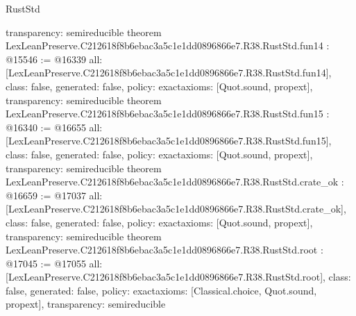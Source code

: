 \begin{lexlean}{RustStd}
\begin{coremodule}
{  transparency: semireducible
}
theorem LexLeanPreserve.C212618f8b6ebac3a5c1e1dd0896866e7.R38.RustStd.fun14 : @15546 := @16339 {
  all: [LexLeanPreserve.C212618f8b6ebac3a5c1e1dd0896866e7.R38.RustStd.fun14],
  class: false,
  generated: false,
  policy: exact{axioms: [Quot.sound, propext]},
  transparency: semireducible
}
theorem LexLeanPreserve.C212618f8b6ebac3a5c1e1dd0896866e7.R38.RustStd.fun15 : @16340 := @16655 {
  all: [LexLeanPreserve.C212618f8b6ebac3a5c1e1dd0896866e7.R38.RustStd.fun15],
  class: false,
  generated: false,
  policy: exact{axioms: [Quot.sound, propext]},
  transparency: semireducible
}
theorem LexLeanPreserve.C212618f8b6ebac3a5c1e1dd0896866e7.R38.RustStd.crate_ok : @16659 := @17037 {
  all: [LexLeanPreserve.C212618f8b6ebac3a5c1e1dd0896866e7.R38.RustStd.crate_ok],
  class: false,
  generated: false,
  policy: exact{axioms: [Quot.sound, propext]},
  transparency: semireducible
}
theorem LexLeanPreserve.C212618f8b6ebac3a5c1e1dd0896866e7.R38.RustStd.root : @17045 := @17055 {
  all: [LexLeanPreserve.C212618f8b6ebac3a5c1e1dd0896866e7.R38.RustStd.root],
  class: false,
  generated: false,
  policy: exact{axioms: [Classical.choice, Quot.sound, propext]},
  transparency: semireducible
}


\end{coremodule}
\end{lexlean}
